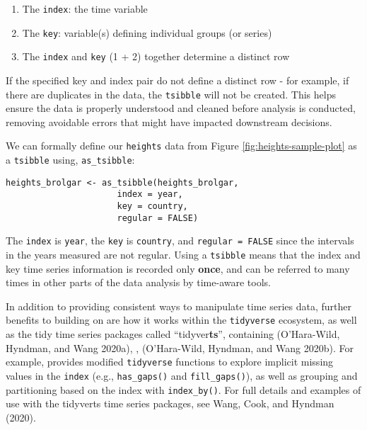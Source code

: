 \begin{enumerate}
\def\labelenumi{\arabic{enumi}.}
\tightlist
\item
  The \texttt{index}: the time variable
\item
  The \texttt{key}: variable(s) defining individual groups (or series)
\item
  The \texttt{index} and \texttt{key} (1 + 2) together determine a distinct row
\end{enumerate}

If the specified key and index pair do not define a distinct row - for example, if there are duplicates in the data, the \texttt{tsibble} will not be created. This helps ensure the data is properly understood and cleaned before analysis is conducted, removing avoidable errors that might have impacted downstream decisions.

We can formally define our \texttt{heights} data from Figure \ref{fig:heights-sample-plot} as a \texttt{tsibble} using, \texttt{as\_tsibble}:

\begin{verbatim}
heights_brolgar <- as_tsibble(heights_brolgar,
                      index = year,
                      key = country,
                      regular = FALSE)
\end{verbatim}

The \texttt{index} is \texttt{year}, the \texttt{key} is \texttt{country}, and \texttt{regular\ =\ FALSE} since the intervals in the years measured are not regular. Using a \texttt{tsibble} means that the index and key time series information is recorded only \textbf{once}, and can be referred to many times in other parts of the data analysis by time-aware tools.

In addition to providing consistent ways to manipulate time series data, further benefits to building on  are how it works within the \texttt{tidyverse} ecosystem, as well as the tidy time series packages called ``tidyver\textbf{ts}'', containing  (O'Hara-Wild, Hyndman, and Wang 2020a), , (O'Hara-Wild, Hyndman, and Wang 2020b). For example,  provides modified \texttt{tidyverse} functions to explore implicit missing values in the \texttt{index} (e.g., \texttt{has\_gaps()} and \texttt{fill\_gaps()}), as well as grouping and partitioning based on the index with \texttt{index\_by()}. For full details and examples of use with the tidyverts time series packages, see Wang, Cook, and Hyndman (2020).


